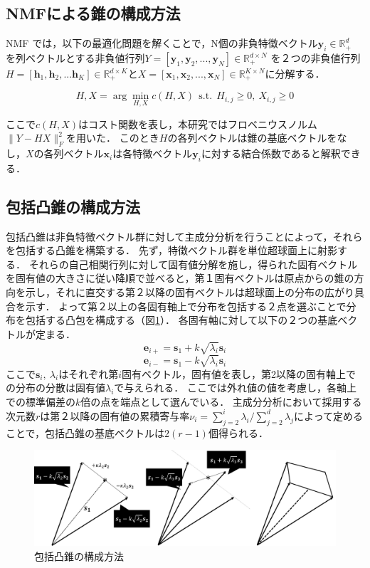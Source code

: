 \documentclass[9pt,a4paper,twocolumn,uplatex]{jsarticle}
\begin{document}
\subsection{NMFによる錐の構成方法}
NMF では，以下の最適化問題を解くことで，N個の非負特徴ベクトル$\bm y_i\in\mathbb R_+^d$ を列ベクトルとする非負値行列$Y=[\bm y_1, \bm y_2,...,\bm y_N]\in\mathbb R_+^{d\times N}$ を２つの非負値行列$H=[\bm h_1,\bm h_2,...\bm h_K]\in\mathbb R_+^{d\times K}$と$X=[\bm x_1,\bm x_2,...,\bm x_N]\in\mathbb R_+^{K\times N}$に分解する．

\begin{equation}
	H,X=\arg\min_{H,X}c(H,X)~~\text{s.t.}~~H_{i,j}\geq 0,~X_{i,j}\geq 0
\end{equation}

ここで$c(H,X)$はコスト関数を表し，本研究ではフロベニウスノルム$\|Y-HX\|_F^2$を用いた．
このとき$H$の各列ベクトルは錐の基底ベクトルをなし，$X$の各列ベクトル$\bm x_i$は各特徴ベクトル$\bm y_i$に対する結合係数であると解釈できる．


\subsection{包括凸錐の構成方法}
包括凸錐は非負特徴ベクトル群に対して主成分分析を行うことによって，それらを包括する凸錐を構築する．
先ず，特徴ベクトル群を単位超球面上に射影する．
それらの自己相関行列に対して固有値分解を施し，得られた固有ベクトルを固有値の大きさに従い降順で並べると，第１固有ベクトルは原点からの錐の方向を示し，それに直交する第２以降の固有ベクトルは超球面上の分布の広がり具合を示す．
よって第２以上の各固有軸上で分布を包括する２点を選ぶことで分布を包括する凸包を構成する（図\ref{fig:howtomakeccone}）．
各固有軸に対して以下の２つの基底ベクトルが定まる．
\begin{equation}
\bm e_{i+}=\bm s_1+k\sqrt{\lambda_i}\bm s_i
\end{equation}
\vspace{-2.5mm}
\begin{equation}
\bm e_{i-}=\bm s_1-k\sqrt{\lambda_i}\bm s_i
\end{equation}
ここで$\bm s_i,~\lambda_i$はそれぞれ第$i$固有ベクトル，固有値を表し，第2以降の固有軸上での分布の分散は固有値$\lambda_i$で与えられる．
ここでは外れ値の値を考慮し，各軸上での標準偏差の$k$倍の点を端点として選んでいる．
主成分分析において採用する次元数$r$は第２以降の固有値の累積寄与率$\nu_i=\sum_{j=2}^{i}\lambda_i/\sum_{j=2}^{d}\lambda_j$によって定めることで，包括凸錐の基底ベクトルは$2(r-1)$個得られる．
\vspace{-1.5mm}
\begin{figure}[htb]
	\centering
	\includegraphics[width=\linewidth]{makeCone}
	\caption{包括凸錐の構成方法}
	\label{fig:howtomakeccone}
\end{figure}
\vspace{-1.5mm}
\end{document}
